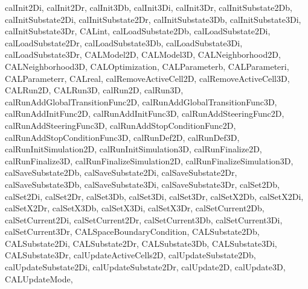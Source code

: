 {{    calInit2Di,
    calInit2Dr,
    calInit3Db,
    calInit3Di,
    calInit3Dr,
    calInitSubstate2Db,
    calInitSubstate2Di,
    calInitSubstate2Dr,
    calInitSubstate3Db,
    calInitSubstate3Di,
    calInitSubstate3Dr,
    CALint,
    calLoadSubstate2Db,
    calLoadSubstate2Di,
    calLoadSubstate2Dr,
    calLoadSubstate3Db,
    calLoadSubstate3Di,
    calLoadSubstate3Dr,
    CALModel2D,
    CALModel3D,
    CALNeighborhood2D,
    CALNeighborhood3D,
    CALOptimization,
    CALParameterb,
    CALParameteri,
    CALParameterr,
    CALreal,
    calRemoveActiveCell2D,
    calRemoveActiveCell3D,
    CALRun2D,
    CALRun3D,
    calRun2D,
    calRun3D,
    calRunAddGlobalTransitionFunc2D,
    calRunAddGlobalTransitionFunc3D,
    calRunAddInitFunc2D,
    calRunAddInitFunc3D,
    calRunAddSteeringFunc2D,
    calRunAddSteeringFunc3D,
    calRunAddStopConditionFunc2D,
    calRunAddStopConditionFunc3D,
    calRunDef2D,
    calRunDef3D,
    calRunInitSimulation2D,
    calRunInitSimulation3D,
    calRunFinalize2D,
    calRunFinalize3D,
    calRunFinalizeSimulation2D,
    calRunFinalizeSimulation3D,
    calSaveSubstate2Db,
    calSaveSubstate2Di,
    calSaveSubstate2Dr,
    calSaveSubstate3Db,
    calSaveSubstate3Di,
    calSaveSubstate3Dr,
    calSet2Db,
    calSet2Di,
    calSet2Dr,
    calSet3Db,
    calSet3Di,
    calSet3Dr,
    calSetX2Db,
    calSetX2Di,
    calSetX2Dr,
    calSetX3Db,
    calSetX3Di,
    calSetX3Dr,
    calSetCurrent2Db,
    calSetCurrent2Di,
    calSetCurrent2Dr,
    calSetCurrent3Db,
    calSetCurrent3Di,
    calSetCurrent3Dr,
    CALSpaceBoundaryCondition,
    CALSubstate2Db,
    CALSubstate2Di,
    CALSubstate2Dr,
    CALSubstate3Db,
    CALSubstate3Di,
    CALSubstate3Dr,
    calUpdateActiveCells2D,
    calUpdateSubstate2Db,
    calUpdateSubstate2Di,
    calUpdateSubstate2Dr,
    calUpdate2D,
    calUpdate3D,
    CALUpdateMode,
    }
}


